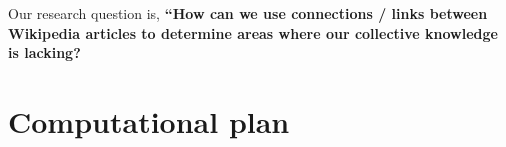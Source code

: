 \documentclass[fontsize=12pt]{article}
\begin{document}
\begin{multicols}{2}
    
    Our research question is, \textbf{``How can we use connections / links between Wikipedia articles to determine areas where our collective knowledge is lacking?}
    
    
    
    
    \section{Computational plan}  %
    
    

\end{multicols}
\end{document}
